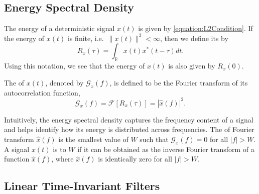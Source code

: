 \subsection{Energy Spectral Density}
\label{subsection:SpectralDensity}

The energy of a deterministic signal $x(t)$ is given by \eqref{equation:L2Condition}.
If the energy of $x(t)$ is finite, i.e.\ $\| x(t) \|^2 < \infty$, then we define its  by
\begin{equation*}
R_x(\tau) = \int_{\mathbb{R}} x(t)x^*(t - \tau) dt .
\end{equation*}
Using this notation, we see that the energy of $x(t)$ is also given by $R_x(0)$.

\begin{definition}
The  of $x(t)$, denoted by $\mathcal{G}_x (f)$, is defined to be the Fourier transform of its autocorrelation function,
\begin{equation*}
\mathcal{G}_x(f) = \mathcal{F} [ R_x (\tau) ] = | \hat{x}(f) |^2.
\end{equation*}
\end{definition}

Intuitively, the energy spectral density captures the frequency content of a signal and helps identify how its energy is distributed across frequencies.
The  of Fourier transform $\hat{x}(f)$ is the smallest value of $W$ such that $\mathcal{G}_x(f) = 0$ for all $|f| > W$.
A signal $x(t)$ is  to $W$ if it can be obtained as the inverse Fourier transform of a function $\hat{x}(f)$, where $\hat{x}(f)$ is identically zero for all $|f| > W$.


\subsection{Linear Time-Invariant Filters}
\label{subsection:LinearTimeInvariantFilters}

